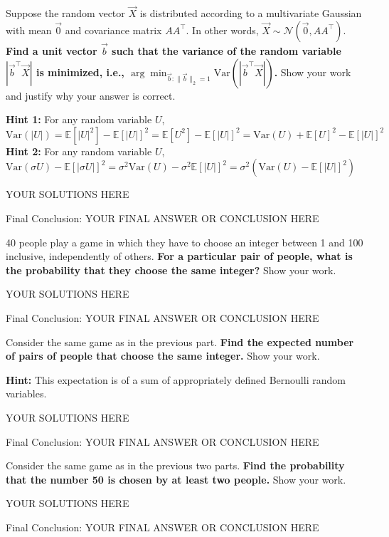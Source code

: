\qpart{[5 points]}

Suppose the random vector $\vec{X}$ is distributed according to a multivariate Gaussian with mean $\vec{0}$ and covariance matrix $AA^\top$. In other words, $\vec{X} \sim \mathcal{N}(\vec{0}, AA^\top)$. \textbf{Find a unit vector $\vec{b}$ such that the variance of the random variable $\left|\vec{b}^\top \vec{X}\right|$ is minimized, i.e., $\arg\min_{\vec{b} : \|\vec{b}\|_2 = 1} \mathrm{Var}\left(\left|\vec{b}^\top \vec{X}\right|\right)$.} Show your work and justify why your answer is correct. 

\textbf{Hint 1:} For any random variable $U$, $\mathrm{Var}(|U|) = \mathbb{E}[|U|^2] - \mathbb{E}[|U|]^2 = \mathbb{E}[U^2] - \mathbb{E}[|U|]^2 = \mathrm{Var}(U) + \mathbb{E}[U]^2 - \mathbb{E}[|U|]^2$
\textbf{Hint 2:} For any random variable $U$, $\mathrm{Var}(\sigma U) - \mathbb{E}[|\sigma U|]^2 = \sigma^2\mathrm{Var}(U) - \sigma^2 \mathbb{E}[|U|]^2 = \sigma^2(\mathrm{Var}(U) - \mathbb{E}[|U|]^2) $

\begin{solution}

YOUR SOLUTIONS HERE

{\color{red} Final Conclusion: YOUR FINAL ANSWER OR CONCLUSION HERE}

\end{solution}

\qpart{[5 points]} 

40 people play a game in which they have to choose an integer between 1 and 100 inclusive, independently of others. \textbf{For a particular pair of people, what is the probability that they choose the same integer?} Show your work. 

\begin{solution}

YOUR SOLUTIONS HERE

{\color{red} Final Conclusion: YOUR FINAL ANSWER OR CONCLUSION HERE}

\end{solution}

\qpart{[5 points]} 

Consider the same game as in the previous part. \textbf{Find the expected number of pairs of people that choose the same integer.} Show your work. 

\textbf{Hint:} This expectation is of a sum of appropriately defined Bernoulli random variables. 

\begin{solution}

YOUR SOLUTIONS HERE

{\color{red} Final Conclusion: YOUR FINAL ANSWER OR CONCLUSION HERE}

\end{solution}

\qpart{[5 points]} 

Consider the same game as in the previous two parts. \textbf{Find the probability that the number 50 is chosen by at least two people.} Show your work. 

\begin{solution}

YOUR SOLUTIONS HERE

{\color{red} Final Conclusion: YOUR FINAL ANSWER OR CONCLUSION HERE}

\end{solution}